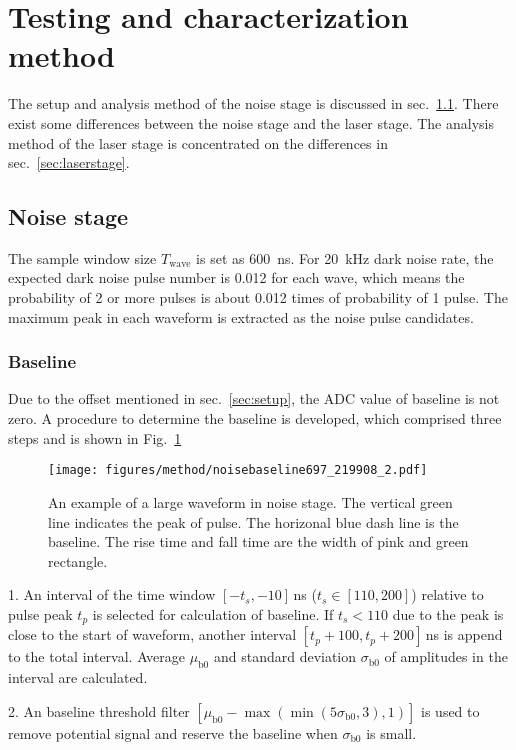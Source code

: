 \section{Testing and characterization method}
\label{Method}
The setup and analysis method of the noise stage is discussed in sec.~\ref{sec:noisestage}. There exist some differences between the noise stage and the laser stage. The analysis method of the laser stage is concentrated on the differences in sec.~\ref{sec:laserstage}.
\subsection{Noise stage}
\label{sec:noisestage}
The sample window size $T_{\mathrm{wave}}$ is set as \SI{600}{ns}. For \SI{20}{kHz} dark noise rate, the expected dark noise pulse number is 0.012 for each wave, which means the probability of 2 or more pulses is about 0.012 times of probability of 1 pulse. The maximum peak in each waveform is extracted as the noise pulse candidates.
\subsubsection{Baseline}
Due to the offset mentioned in sec.~\ref{sec:setup}, the ADC value of baseline is not zero. A procedure to determine the baseline is developed, which comprised three steps and is shown in Fig.~\ref{fig:baseline1}
\begin{figure}[!htbp]
    \centering
    \texttt{[image: figures/method/noisebaseline697\_219908\_2.pdf]}
    \caption{An example of a large waveform in noise stage. The vertical green line indicates the peak of pulse. The horizonal blue dash line is the baseline. The rise time and fall time are the width of pink and green rectangle.}
    \label{fig:baseline1}
\end{figure}

1. An interval of the time window $[-t_s,-10]$\,ns ($t_s\in[110,200]$) relative to pulse peak $t_p$ is selected for calculation of baseline. If $t_s < 110$ due to the peak is close to the start of waveform, another interval $[t_p+100,t_p+200]$\,ns is append to the total interval. Average $\mu_{\mathrm{b0}}$ and standard deviation $\sigma_{\mathrm{b0}}$ of amplitudes in the interval are calculated.

2. An baseline threshold filter $[\mu_{\mathrm{b0}}-\max(\min(5\sigma_{\mathrm{b0}},3),1)]$ is used to remove potential signal and reserve the baseline when $\sigma_{\mathrm{b0}}$ is small.

